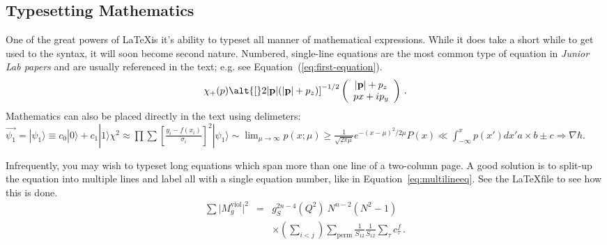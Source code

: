 \subsection{Typesetting Mathematics}

One of the great powers of \LaTeX is it's ability to typeset all
manner of mathematical expressions.  While it does take a short
while to get used to the syntax, it will soon become second nature.
Numbered, single-line equations are the most common type of equation
in \textit{Junior Lab papers} and are usually referenced in the
text; e.g. see Equation~(\ref{eq:first-equation}).
%
\begin{equation}
   \chi_+(p)\alt{\bf [}2|{\bf p}|(|{\bf p}|+p_z){\bf ]}^{-1/2}
   \left(
   \begin{array}{c}
      |{\bf p}|+p_z\\
      px+ip_y
   \end{array}\right)
\,. \label{eq:first-equation}
\end{equation}
%
%
Mathematics can also be placed directly in the text using
delimeters: $\vec{\psi_1} = |\psi_1\rangle \equiv c_0|0\rangle +
c_1|1\rangle \chi^2 \approx
\prod\sum\left[\frac{y_i-f(x_i)}{\sigma_i}\right]^2 |\psi_1\rangle
\sim \lim_{\mu \rightarrow \infty}p(x;\mu) \geq \frac{1}{\sqrt{2 \pi
\mu}} e^{-(x-\mu)^2 / 2\mu}P(x) \ll \int_{-\infty}^x p(x')dx'a
\times b \pm c \Rightarrow \nabla \hbar$.

Infrequently, you may wish to typeset long equations which span more
than one line of a two-column page.  A good solution is to split-up
the equation into multiple lines and label all with a single
equation number, like in Equation~\ref{eq:multilineeq}.  See the
\LaTeX file to see how this is done.
%
\begin{eqnarray}
  \sum \vert M^{\text{viol}}_g \vert ^2
   &=&  g^{2n-4}_S(Q^2)~N^{n-2} (N^2-1)
\nonumber
\\
   &&   \times \left( \sum_{i<j}\right) \sum_{\text{perm}}
            \frac{1}{S_{12}}  \frac{1}{S_{12}} \sum_\tau c^f_\tau
\,.
\label{eq:multilineeq}
\end{eqnarray}

